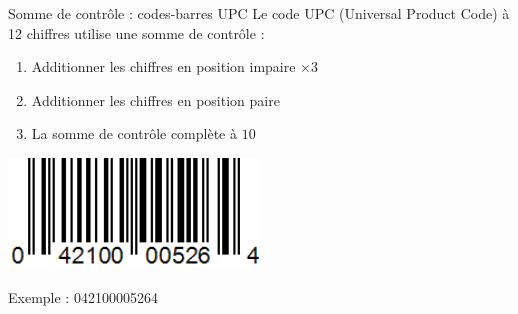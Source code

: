 \begin{frame}{Somme de contrôle : codes-barres UPC}
  Le code UPC (Universal Product Code) à 12 chiffres utilise une somme de contrôle :

  \begin{enumerate}
    \item Additionner les chiffres en position impaire $\times 3$
    \item Additionner les chiffres en position paire
    \item La somme de contrôle complète à $10$
  \end{enumerate}

  \begin{center}
    \includegraphics[width=0.5\textwidth]{img/upc-barcode.png}
    
    Exemple : 042100005264
  \end{center}
\end{frame}
